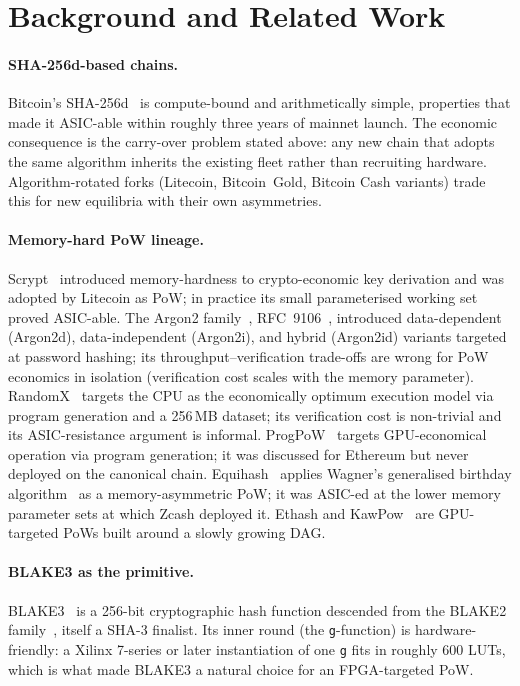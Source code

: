 \documentclass[11pt,a4paper]{article}
\theoremstyle{plain}
\theoremstyle{definition}
\theoremstyle{remark}
\begin{document}
\section{Background and Related Work}\label{sec:related}

\paragraph{SHA-256d-based chains.}
Bitcoin's SHA-256d~\cite{nakamoto2008bitcoin} is compute-bound and
arithmetically simple, properties that made it ASIC-able within
roughly three years of mainnet launch. The economic consequence is
the carry-over problem stated above: any new chain that adopts the
same algorithm inherits the existing fleet rather than recruiting
hardware. Algorithm-rotated forks (Litecoin, Bitcoin~Gold, Bitcoin
Cash variants) trade this for new equilibria with their own
asymmetries.

\paragraph{Memory-hard PoW lineage.}
Scrypt~\cite{percival2009scrypt} introduced memory-hardness to
crypto-economic key derivation and was adopted by Litecoin as PoW; in
practice its small parameterised working set proved ASIC-able. The
Argon2 family~\cite{biryukov2016argon2}, RFC~9106~\cite{rfc9106},
introduced data-dependent (Argon2d), data-independent (Argon2i), and
hybrid (Argon2id) variants targeted at password hashing; its
throughput--verification trade-offs are wrong for PoW economics in
isolation (verification cost scales with the memory parameter).
RandomX~\cite{tevador2019randomx} targets the CPU as the
economically optimum execution model via program generation and a
256\,MB dataset; its verification cost is non-trivial and its
ASIC-resistance argument is informal.
ProgPoW~\cite{programmaticpow2019} targets GPU-economical operation
via program generation; it was discussed for Ethereum but never
deployed on the canonical chain. Equihash~\cite{biryukov2017equihash}
applies Wagner's generalised birthday algorithm~\cite{wagner2002gbp}
as a memory-asymmetric PoW; it was ASIC-ed at the lower memory
parameter sets at which Zcash deployed it. Ethash and
KawPow~\cite{ethash} are GPU-targeted PoWs built around a slowly
growing DAG.

\paragraph{BLAKE3 as the primitive.}
BLAKE3~\cite{oconnor2020blake3} is a 256-bit cryptographic hash
function descended from the BLAKE2 family~\cite{aumasson2013blake2},
itself a SHA-3 finalist. Its inner round (the \texttt{g}-function)
is hardware-friendly: a Xilinx 7-series or later instantiation of one
\texttt{g} fits in roughly 600 LUTs, which is what made BLAKE3 a
natural choice for an FPGA-targeted PoW.
\end{document}
